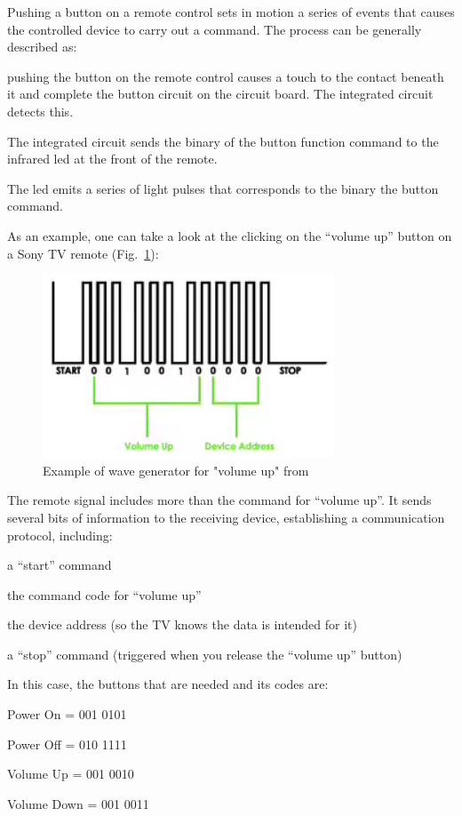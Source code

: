 Pushing a button on a remote control sets in motion a series of events
that causes the controlled device to carry out a command. The process
can be generally described as:
\begin{enum-c}
\item 
pushing the button on the remote control causes a touch to the contact beneath it and complete the button circuit on the circuit board. The integrated circuit detects this.
\item 
The integrated circuit sends the binary of the button function command to the
infrared \gls{led} at the front of the remote.
\item 
The \gls{led} emits a series of light pulses that corresponds to the binary the button command.
\end{enum-c}

As an example, one can take a look at the clicking on the ``volume up'' button
on a Sony TV remote (Fig.~\ref{fig:btncode}):
%
  \vspace{-5mm}
%  
%
\begin{figure}[htb!]
\centering
    \includegraphics[width=0.45\columnwidth]{./img/buttoncode.png}
  \caption{Example of wave generator for "volume up" from~\cite{btncode}}%
\label{fig:btncode}
\end{figure}

The remote signal includes more than the command for ``volume up''. It sends
several bits of information to the receiving device, establishing a
communication protocol, including:
\begin{item-c}
\item a ``start'' command
\item the command code for ``volume up''
\item the device address (so the TV knows the data is intended for it)
\item a ``stop'' command (triggered when you release the ``volume up'' button)
\end{item-c}

In this case, the buttons that are needed and its codes are:
\begin{item-c}
\item
Power On = 001 0101
\item
Power Off = 010 1111
\item
Volume Up = 001 0010
\item
Volume Down = 001 0011
\end{item-c}
%
  \vspace{-5mm}
%  

